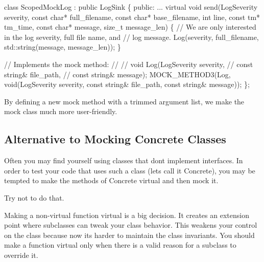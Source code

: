 \begin{DoxyCode}
\textcolor{keyword}{class }ScopedMockLog : \textcolor{keyword}{public} LogSink \{
 \textcolor{keyword}{public}:
  ...
  \textcolor{keyword}{virtual} \textcolor{keywordtype}{void} send(LogSeverity severity, \textcolor{keyword}{const} \textcolor{keywordtype}{char}* full\_filename,
                    \textcolor{keyword}{const} \textcolor{keywordtype}{char}* base\_filename, \textcolor{keywordtype}{int} line, \textcolor{keyword}{const} tm* tm\_time,
                    \textcolor{keyword}{const} \textcolor{keywordtype}{char}* message, \textcolor{keywordtype}{size\_t} message\_len) \{
    \textcolor{comment}{// We are only interested in the log severity, full file name, and}
    \textcolor{comment}{// log message.}
    Log(severity, full\_filename, std::string(message, message\_len));
  \}

  \textcolor{comment}{// Implements the mock method:}
  \textcolor{comment}{//}
  \textcolor{comment}{//   void Log(LogSeverity severity,}
  \textcolor{comment}{//            const string& file\_path,}
  \textcolor{comment}{//            const string& message);}
  MOCK\_METHOD3(Log, \textcolor{keywordtype}{void}(LogSeverity severity, \textcolor{keyword}{const} \textcolor{keywordtype}{string}& file\_path,
                         \textcolor{keyword}{const} \textcolor{keywordtype}{string}& message));
\};
\end{DoxyCode}


By defining a new mock method with a trimmed argument list, we make the mock class much more user-\/friendly.

\subsection*{Alternative to Mocking Concrete Classes}

Often you may find yourself using classes that don\textquotesingle{}t implement interfaces. In order to test your code that uses such a class (let\textquotesingle{}s call it {\ttfamily Concrete}), you may be tempted to make the methods of {\ttfamily Concrete} virtual and then mock it.

Try not to do that.

Making a non-\/virtual function virtual is a big decision. It creates an extension point where subclasses can tweak your class\textquotesingle{} behavior. This weakens your control on the class because now it\textquotesingle{}s harder to maintain the class\textquotesingle{} invariants. You should make a function virtual only when there is a valid reason for a subclass to override it.

